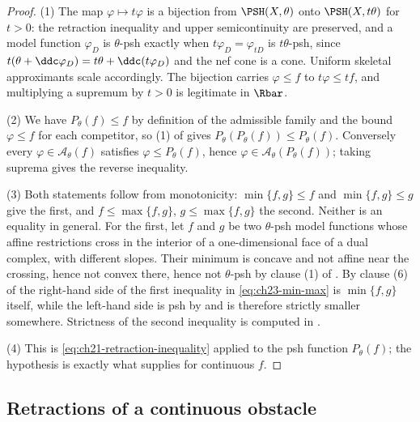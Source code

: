\begin{proof}
(1)  The map $\varphi\mapsto t\varphi$ is a bijection from
$\PSH(X,\theta)$ onto $\PSH(X,t\theta)$ for $t>0$: the retraction
inequality and upper semicontinuity are preserved, and a model function
$\varphi_D$ is $\theta$-psh exactly when $t\varphi_D=\varphi_{tD}$ is
$t\theta$-psh, since $t(\theta+\ddc\varphi_D)=t\theta+\ddc(t\varphi_D)$
and the nef cone is a cone.  Uniform skeletal approximants scale
accordingly.  The bijection carries $\varphi\leq f$ to $t\varphi\leq tf$,
and multiplying a supremum by $t>0$ is legitimate in $\Rbar$.

(2)  We have $P_\theta(f)\leq f$ by definition of the admissible family
and the bound $\varphi\le f$ for each competitor, so (1) of
 gives
$P_\theta(P_\theta(f))\leq P_\theta(f)$.  Conversely every
$\varphi\in\mathcal A_\theta(f)$ satisfies $\varphi\leq P_\theta(f)$,
hence $\varphi\in\mathcal A_\theta(P_\theta(f))$; taking suprema gives the
reverse inequality.

(3)  Both statements follow from monotonicity: $\min\{f,g\}\leq f$ and
$\min\{f,g\}\leq g$ give the first, and $f\leq\max\{f,g\}$,
$g\leq\max\{f,g\}$ the second.  Neither is an equality in general.  For
the first, let $f$ and $g$ be two $\theta$-psh model functions whose
affine restrictions cross in the interior of a one-dimensional face of a
dual complex, with different slopes.  Their minimum is concave and not affine near the
crossing, hence not convex there, hence not $\theta$-psh by clause (1) of
.  By clause (6) of
 the right-hand side of the first
inequality in \eqref{eq:ch23-min-max} is $\min\{f,g\}$ itself, while the
left-hand side is psh by  and is
therefore strictly smaller somewhere.  Strictness of the second inequality is
computed in .

(4)  This is \eqref{eq:ch21-retraction-inequality} applied to the psh
function $P_\theta(f)$; the hypothesis is exactly what
 supplies for continuous $f$.
\end{proof}

\subsection{Retractions of a continuous obstacle}
\label{sec:ch23-retraction-uniform}


